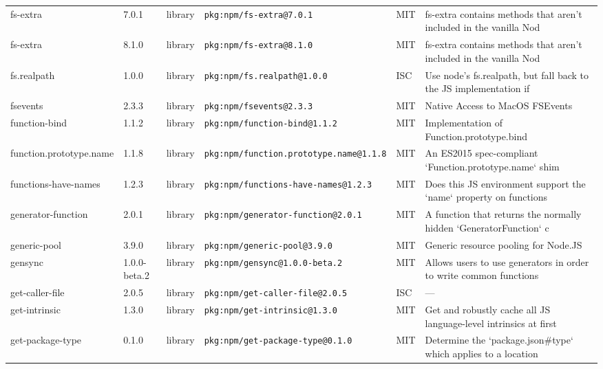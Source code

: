 \documentclass[11pt,a4paper]{article}
\begin{document}
\begin{longtable}{|p{4cm}|p{2cm}|p{1.6cm}|p{5cm}|p{1.5cm}|p{3.5cm}|}
\raggedright fs-extra & 7.0.1 & library & \small\texttt{pkg:npm/fs-extra@7.0.1} & MIT & \small fs-extra contains methods that aren't included in the vanilla Nod \\
\raggedright fs-extra & 8.1.0 & library & \small\texttt{pkg:npm/fs-extra@8.1.0} & MIT & \small fs-extra contains methods that aren't included in the vanilla Nod \\
\raggedright fs.realpath & 1.0.0 & library & \small\texttt{pkg:npm/fs.realpath@1.0.0} & ISC & \small Use node's fs.realpath, but fall back to the JS implementation if \\
\raggedright fsevents & 2.3.3 & library & \small\texttt{pkg:npm/fsevents@2.3.3} & MIT & \small Native Access to MacOS FSEvents \\
\raggedright function-bind & 1.1.2 & library & \small\texttt{pkg:npm/function-bind@1.1.2} & MIT & \small Implementation of Function.prototype.bind \\
\raggedright function.prototype.name & 1.1.8 & library & \small\texttt{pkg:npm/function.prototype.name@1.1.8} & MIT & \small An ES2015 spec-compliant `Function.prototype.name` shim \\
\raggedright functions-have-names & 1.2.3 & library & \small\texttt{pkg:npm/functions-have-names@1.2.3} & MIT & \small Does this JS environment support the `name` property on functions \\
\raggedright generator-function & 2.0.1 & library & \small\texttt{pkg:npm/generator-function@2.0.1} & MIT & \small A function that returns the normally hidden `GeneratorFunction` c \\
\raggedright generic-pool & 3.9.0 & library & \small\texttt{pkg:npm/generic-pool@3.9.0} & MIT & \small Generic resource pooling for Node.JS \\
\raggedright gensync & 1.0.0-beta.2 & library & \small\texttt{pkg:npm/gensync@1.0.0-beta.2} & MIT & \small Allows users to use generators in order to write common functions \\
\raggedright get-caller-file & 2.0.5 & library & \small\texttt{pkg:npm/get-caller-file@2.0.5} & ISC & \small — \\
\raggedright get-intrinsic & 1.3.0 & library & \small\texttt{pkg:npm/get-intrinsic@1.3.0} & MIT & \small Get and robustly cache all JS language-level intrinsics at first  \\
\raggedright get-package-type & 0.1.0 & library & \small\texttt{pkg:npm/get-package-type@0.1.0} & MIT & \small Determine the `package.json\#type` which applies to a location \\

\end{longtable}
\end{document}

